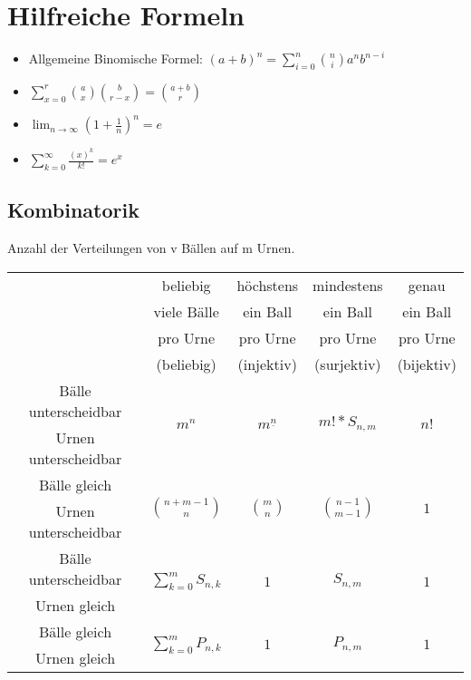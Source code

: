 \section{Hilfreiche Formeln}

\begin{itemize}
\item Allgemeine Binomische Formel: $(a+b)^n=\sum^n_{i=0}\binom {n}{i}a^nb^{n-i}$
\item $\sum^r_{x=0}\binom{a}{x}\binom{b}{r-x}=\binom{a+b}{r}$
\item $\lim_{n\rightarrow\infty}\left(1+\frac{1}{n}\right)^n=e$
\item $\sum_{k=0}^\infty\frac{(x)^k}{k!}=e^x$
\end{itemize}

\subsection{Kombinatorik}
Anzahl der Verteilungen von v Bällen auf m Urnen.\\
\begin{tabular}{|c||c|c|c|c|}
\hline
&beliebig &höchstens &mindestens&genau\\
&viele Bälle&ein Ball& ein Ball& ein Ball\\
& pro Urne& pro Urne& pro Urne& pro Urne\\
& (beliebig)& (injektiv) & (surjektiv)& (bijektiv)\\
\hline
\hline
Bälle unterscheidbar& \multirow{2}{*}{$m^n$} &\multirow{2}{*}{$m^\underline{n}$} &\multirow{2}{*}{$m!*S_{n,m}$} &\multirow{2}{*}{$n!$}\\
Urnen unterscheidbar &&&&\\
\hline
Bälle gleich& \multirow{2}{*}{$\binom{n+m-1}{n}$} &\multirow{2}{*}{$\binom{m}{n}$} &\multirow{2}{*}{$\binom{n-1}{m-1}$} &\multirow{2}{*}{$1$}\\
Urnen unterscheidbar &&&&\\
\hline
Bälle unterscheidbar& \multirow{2}{*}{$\sum^m_{k=0}S_{n,k}$} &\multirow{2}{*}{$1$} &\multirow{2}{*}{$S_{n,m}$} &\multirow{2}{*}{$1$}\\
Urnen gleich &&&&\\
\hline
Bälle gleich& \multirow{2}{*}{$\sum^m_{k=0}P_{n,k}$} &\multirow{2}{*}{$1$} &\multirow{2}{*}{$P_{n,m}$} &\multirow{2}{*}{$1$}\\
Urnen gleich &&&&\\
\hline
\end{tabular}
